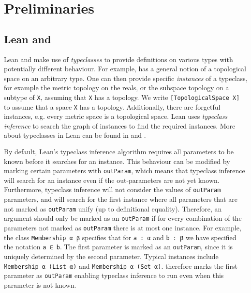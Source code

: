 \section{Preliminaries}

\subsection{Lean and \mathlib}\label{sub:leanandmathlib}

Lean and \mathlib make use of \emph{typeclasses} to provide definitions on various types with potentially different behaviour.
For example, \mathlib has a general notion of a topological space on an arbitrary type.
One can then provide specific \emph{instances} of a typeclass, for example the metric topology on the reals, or the subspace topology on a subtype of \lstinline|X|, assuming that \lstinline|X| has a topology. 
We write \lstinline|[TopologicalSpace X]| to assume that a space \lstinline|X| has a topology.
Additionally, there are forgetful instances, e.g. every metric space is a topological space. %
Lean uses \emph{typeclass inference} to search the graph of instances to find the required instances.
More about typeclasses in Lean can be found in \cite{Selsam2020} and \cite{Baanen2025}.

By default, Lean's typeclass inference algorithm requires all parameters to be known before it searches for an instance. This behaviour can be modified by marking certain parameters with \lstinline|outParam|, which means that typeclass inference will search for an instance even if the out-parameters are not yet known.
Furthermore, typeclass inference will not consider the values of \lstinline|outParam| parameters, and will search for the first instance where all parameters that are not marked as \lstinline|outParam| unify (up to definitional equality).
Therefore, an argument should only be marked as an \lstinline|outParam| if for every combination of the parameters not marked as \lstinline|outParam| there is at most one instance.
For example, the class \lstinline|Membership α β| specifies that for \lstinline|a : α| and \lstinline|b : β| we have specified the notation \lstinline|a ∈ b|. 
The first parameter is marked as an \lstinline|outParam|, since it is uniquely determined by the second parameter. Typical instances include \lstinline|Membership α (List α)| and \lstinline|Membership α (Set α)|.
\mathlib therefore marks the first parameter as \lstinline|outParam| enabling typeclass inference to run even when this parameter is not known.

